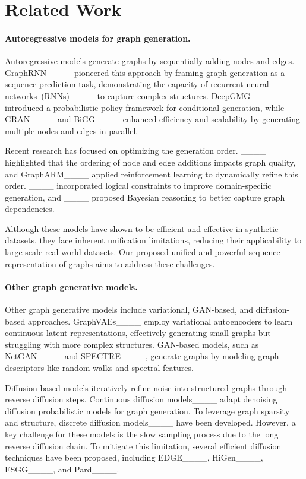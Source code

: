 \section{Related Work}
\paragraph{Autoregressive models for graph generation.}
Autoregressive models generate graphs by sequentially adding nodes and edges. GraphRNN____ pioneered this approach by framing graph generation as a sequence prediction task, demonstrating the capacity of recurrent neural networks~(RNNs)____ to capture complex structures. DeepGMG____ introduced a probabilistic policy framework for conditional generation, while GRAN____ and BiGG____ enhanced efficiency and scalability by generating multiple nodes and edges in parallel.

Recent research has focused on optimizing the generation order. ____ highlighted that the ordering of node and edge additions impacts graph quality, and GraphARM____ applied reinforcement learning to dynamically refine this order. ____ incorporated logical constraints to improve domain-specific generation, and ____ proposed Bayesian reasoning to better capture graph dependencies.

Although these models have shown to be efficient and effective in synthetic datasets, they face inherent unification limitations, reducing their applicability to large-scale real-world datasets. Our proposed unified and powerful sequence representation of graphs aims to address these challenges.

\vspace{-.1in}
\paragraph{Other graph generative models.}

Other graph generative models include variational, GAN-based, and diffusion-based approaches. GraphVAEs____ employ variational autoencoders to learn continuous latent representations, effectively generating small graphs but struggling with more complex structures. GAN-based models, such as NetGAN____ and SPECTRE____, generate graphs by modeling graph descriptors like random walks and spectral features.

Diffusion-based models iteratively refine noise into structured graphs through reverse diffusion steps. Continuous diffusion models____ adapt denoising diffusion probabilistic models for graph generation. To leverage graph sparsity and structure, discrete diffusion models____ have been developed. However, a key challenge for these models is the slow sampling process due to the long reverse diffusion chain. To mitigate this limitation, several efficient diffusion techniques have been proposed, including EDGE____, HiGen____, ESGG____, and Pard____.

